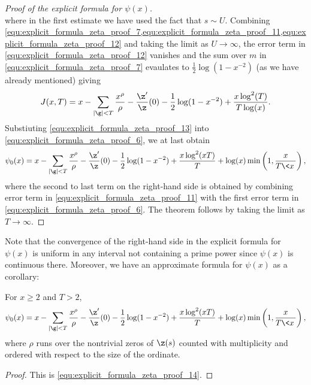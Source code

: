 \begin{proof}[Proof of the explicit formula for $\psi(x)$]
\begin{equation}
        \end{equation}
        where in the first estimate we have used the fact that $s \sim U$. Combining \cref{equ:explicit_formula_zeta_proof_7,equ:explicit_formula_zeta_proof_11,equ:explicit_formula_zeta_proof_12} and taking the limit as $U \to \infty$, the error term in \cref{equ:explicit_formula_zeta_proof_12} vanishes and the sum over $m$ in \cref{equ:explicit_formula_zeta_proof_7} evaulates to $\frac{1}{2}\log(1-x^{-2})$ (as we have already mentioned) giving
        \begin{equation}\label{equ:explicit_formula_zeta_proof_13}
          J(x,T) = x-\sum_{|\g| < T}\frac{x^{\rho}}{\rho}-\frac{\z'}{\z}(0)-\frac{1}{2}\log(1-x^{-2})+\frac{x\log^{2}(T)}{T\log(x)}.
        \end{equation}
        Substiuting \cref{equ:explicit_formula_zeta_proof_13} into \cref{equ:explicit_formula_zeta_proof_6}, we at last obtain
        \begin{equation}\label{equ:explicit_formula_zeta_proof_14}
          \psi_{0}(x) = x-\sum_{|\g| < T}\frac{x^{\rho}}{\rho}-\frac{\z'}{\z}(0)-\frac{1}{2}\log(1-x^{-2})+\frac{x\log^{2}(xT)}{T}+\log(x)\min\left(1,\frac{x}{T\<x\>}\right),
        \end{equation}
        where the second to last term on the right-hand side is obtained by combining error term in \cref{equ:explicit_formula_zeta_proof_11} with the first error term in \cref{equ:explicit_formula_zeta_proof_6}. The theorem follows by taking the limit as $T \to \infty$.
      \end{proof}

      Note that the convergence of the right-hand side in the explicit formula for $\psi(x)$ is uniform in any interval not containing a prime power since $\psi(x)$ is continuous there. Moreover, we have an approximate formula for $\psi(x)$ as a corollary:

      \begin{corollary}\label{cor:explicit_formula_zeta_corollary}
         For $x \ge 2$ and $T > 2$,
        \[
           \psi_{0}(x) = x-\sum_{|\g| < T}\frac{x^{\rho}}{\rho}-\frac{\z'}{\z}(0)-\frac{1}{2}\log(1-x^{-2})+\frac{x\log^{2}(xT)}{T}+\log(x)\min\left(1,\frac{x}{T\<x\>}\right),
        \]
        where $\rho$ runs over the nontrivial zeros of $\z(s)$ counted with multiplicity and ordered with respect to the size of the ordinate.
      \end{corollary}
      \begin{proof}
        This is \cref{equ:explicit_formula_zeta_proof_14}.
      \end{proof}
